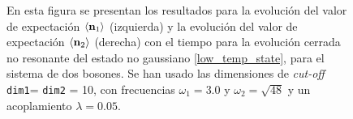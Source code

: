 \documentclass{report} %
\newcommand{\lgg}{\langle}
\newcommand{\rgg}{\rangle}
\numberwithin{equation}{section}
\begin{document}
\begin{figure}
    \centering
    \qquad
    \caption{En esta figura se presentan los resultados para la evolución del valor de expectación $\lgg {\bf n}_1 \rgg$ (izquierda) y la evolución del valor de expectación $\lgg {\bf n}_2 \rgg$ (derecha) con el tiempo para la evolución cerrada no resonante del estado no gaussiano  \eqref{low_temp_state}, para el sistema de dos bosones. Se han usado las dimensiones de \textit{cut-off} \texttt{dim1}= \texttt{dim2} = 10, con frecuencias $\omega_1 = 3.0$ y $\omega_2 =\sqrt{48}$ y un acoplamiento $\lambda = 0.05$.}
    \label{ocupations_low_closed_nonres}
\end{figure}
\end{document}
